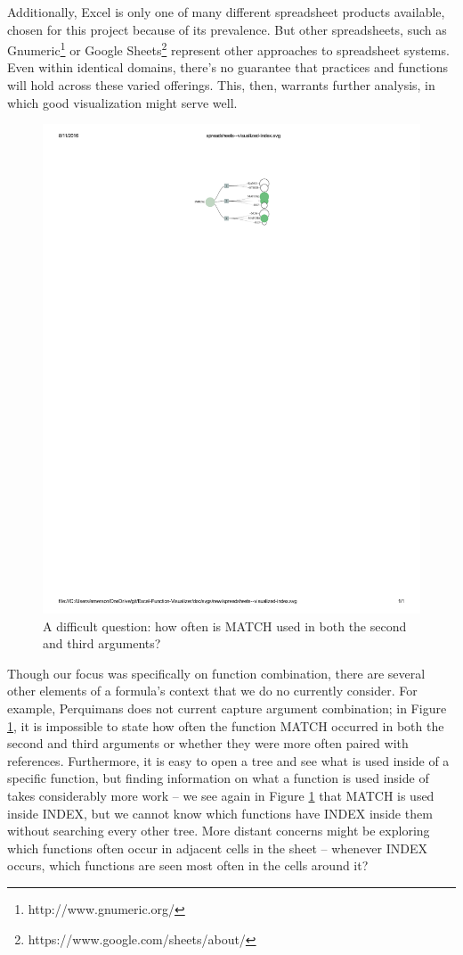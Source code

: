 \documentclass[conference]{IEEEtran}
\newcommand{\toolname}{Perquimans }
\begin{document}
	Additionally, Excel is only one of many different spreadsheet products
	available, chosen for this project because of its prevalence. But other
	spreadsheets, such as Gnumeric\footnote{http://www.gnumeric.org/} or Google
	Sheets\footnote{https://www.google.com/sheets/about/} represent other
	approaches to spreadsheet systems. Even within identical domains, there's no
	guarantee that practices and functions will hold across these varied offerings.
	This, then, warrants further analysis, in which good visualization might serve
	well. \par
	
	\begin{figure} \centering \includegraphics[width=.5\textwidth]{index}
		 \caption{A difficult question: how often is MATCH used in
			both the second and third arguments?} \label{fig:index} \end{figure}
	
	Though our focus was specifically on function combination, there are several
	other elements of a formula's context that we do no currently consider. For
	example, \toolname does not current capture argument combination; in Figure
	\ref{fig:index}, it is impossible to state how often the function MATCH
	occurred in both the second and third arguments or whether they were more often
	paired with references. Furthermore, it is easy to open a tree and see what is
	used inside of a specific function, but finding information on what a function
	is used inside of takes considerably more work -- we see again in Figure
	\ref{fig:index} that MATCH is used inside INDEX, but we cannot know which
	functions have INDEX inside them without searching every other tree. More
	distant concerns might be exploring which functions often occur in adjacent
	cells in the sheet -- whenever INDEX occurs, which functions are seen most
	often in the cells around it?
	
\end{document}
